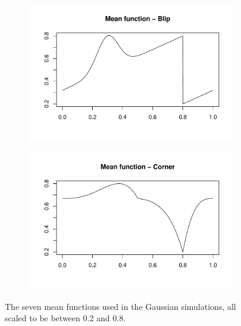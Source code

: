 \documentclass[12pt]{article}
\begin{document}
\begin{figure}
\begin{subfigure}[b]{0.48\textwidth}
        \includegraphics[width=\textwidth]{gaus_blip.pdf}
        \caption{}
        \label{fig:gaus_blip}
    \end{subfigure}
		\hfill
		\begin{subfigure}[b]{0.48\textwidth}
        \centering
        \includegraphics[width=\textwidth]{gaus_cor.pdf}
        \caption{}
        \label{fig:gaus_cor}
    \end{subfigure}
    \caption{The seven mean functions used in the Gaussian simulations, all scaled to be between 0.2 and 0.8.}
    \label{fig:gaus_mean}
\end{figure}
\end{document}
